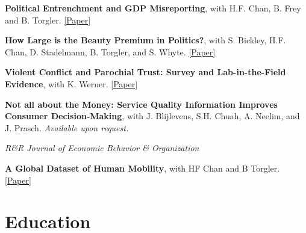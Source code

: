 \documentclass[letterpaper]{article}
\renewenvironment{itemize}{
  \begin{list}{}{
    \setlength{\leftmargin}{1.5em}
  }
}{
  \end{list}
}
\begin{document}
\begin{itemize}
	
	
	\item {\bf Political Entrenchment and GDP Misreporting}, with H.F. Chan, B. Frey and B. Torgler. 
 \href{https://www.cesifo.org/DocDL/cesifo1_wp7653.pdf}{[Paper]}
	


	
		\medskip
		

	\item \textbf{How Large is the Beauty Premium in Politics?}, with S. Bickley, H.F. Chan, D. Stadelmann, B. Torgler, and S. Whyte.  \href{https://papers.ssrn.com/sol3/papers.cfm?abstract_id=4273311}{[Paper]}
 
				\medskip
	\item \textbf{Violent Conflict and Parochial Trust: Survey and Lab-in-the-Field Evidence}, with K. Werner. \href{https://papers.ssrn.com/sol3/papers.cfm?abstract_id=4294035}{[Paper]}
	
\medskip
	
\item \textbf{Not all about the Money: Service Quality Information Improves Consumer Decision-Making}, with J. Blijlevens, S.H. Chuah, A. Neelim, and J. Prasch. \textit{Available upon request.}

\begin{itemize}
\item \textit{R\&R Journal of Economic Behavior \& Organization}
\end{itemize}
	
	\medskip
\item \textbf{A Global Dataset of Human Mobility}, with HF Chan and B Torgler. \href{https://drive.google.com/file/d/1\_0UwLGb5UwmHztSybZu\_1er8125UCmy0/view}{[Paper]}	


 
\end{itemize}



\section*{Education}
\end{document}
